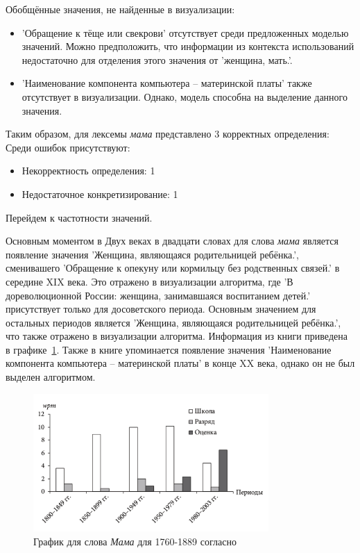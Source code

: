 Обобщённые значения, не найденные в визуализации:
\begin{itemize}
    \item ’Обращение к тёще или свекрови’ отсутствует среди предложенных моделью значений.
Можно предположить, что информации из контекста использований недостаточно для отделения
этого значения от ’женщина, мать.’.

    \item ’Наименование компонента компьютера – материнской платы’ также отсутствует в визуализации.
Однако, модель способна на выделение данного значения.  %
\end{itemize}

Таким образом, для лексемы \textit{мама} представлено 3 корректных определения:
Среди ошибок присутствуют:
\begin{itemize}
    \item Некорректность определения: 1
    \item Недостаточное конкретизирование: 1
\end{itemize}

Перейдем к частотности значений.

Основным моментом в Двух веках в двадцати словах для слова \textit{мама}
является появление значения ’Женщина, являющаяся родительницей ребёнка.’, сменивашего
’Обращение к опекуну или кормильцу без родственных связей.’ в середине XIX века.
Это отражено в визуализации алгоритма, где ’В дореволюционной России: женщина, занимавшаяся воспитанием детей.’
присутствует только для досоветского периода.
Основным значением для остальных периодов является ’Женщина, являющаяся родительницей ребёнка.’,
что также отражено в визуализации алгоритма.
Информация из книги приведена в графике~\ref{fig:TwoCenturiesMom}.
Также в книге упоминается появление значения ’Наименование компонента компьютера – материнской платы’
в конце XX века, однако он не был выделен алгоритмом.

\begin{figure}[H]
    \centering %
    \includegraphics[width=0.8\textwidth]{img/book/klassnij/all}
    \caption{График для слова \textit{Мама} для 1760-1889 согласно~\cite{TwoCenturies}}
    \label{fig:TwoCenturiesMom}
\end{figure}

